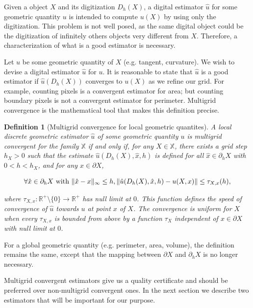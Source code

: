 \documentclass[runningheads]{llncs}
\newtheorem{ddef}{Definition}
\DeclarePairedDelimiter\norm{\lVert}{\rVert}%
\begin{document}
Given a object $X$ and its digitization $D_h(X)$, a digital estimator $\hat{u}$ for some geometric quantity $u$ is intended to compute $u(X)$ by using only the digitization. This problem is not well posed, as the same digital object could be the digitization of infinitely others objects very different from $X$. Therefore, a characterization of what is a good estimator is necessary.

Let $u$ be some geometric quantity of $X$ (e.g. tangent, curvature). We wish to devise a digital estimator $\hat{u}$ for $u$. It is reasonable to state that $\hat{u}$ is a good estimator if $\hat{u}(D_h(X))$ converges to $u(X)$ as we refine our grid. For example, counting pixels is a convergent estimator for area; but counting boundary pixels is not a convergent estimator for perimeter. Multigrid convergence is the mathematical tool that makes this definition precise.


	
	\begin{ddef}[Multigrid convergence for local geometric quantites]
		A local discrete geometric estimator $\hat{u}$ of some geometric quantity $u$ is multigrid convergent for the family $\mathbb{X}$ if and only if, for any $X \in \mathbb{X}$, there exists a grid step $h_X>0$ such that the estimate $\hat{u}(D_h(X),\hat{x},h)$ is defined for all $\hat{x} \in \partial_hX$ with $ 0 < h < h_X$, and for any $x \in \partial X$,
		
		\begin{equation}
			\forall \hat{x} \in  \partial_hX \text{ with } \norm{ \hat{x} - x }_{\infty} \leq h, \norm{ \hat{u}(D_h(X),\hat{x},h) - u(X,x)} \leq \tau_{X,x}(h),			
		\end{equation}
		
		where $\tau_{X,x}:\mathbb{R}^{+}\setminus\{0\} \rightarrow \mathbb{R}^{+}$ has null limit at $0$. This function defines the speed of convergence of $\hat{u}$ towards $u$ at point $x$ of $X$. The convergence is uniform for $X$ when every $\tau_{X,x}$ is bounded from above by a function $\tau_X$ independent of $x \in \partial X$ with null limit at $0$.
	\end{ddef}
	
	
	For a global geometric quantity (e.g. perimeter, area, volume), the definition remains the same, except that the mapping between $\partial X$ and $\partial_h X$ is no longer necessary.
	
	
	Multigrid convergent estimators give us a quality certificate and should be preferred over non-multigrid convergent ones. In the next section we describe two estimators that will be important for our purpose.
	
\end{document}
